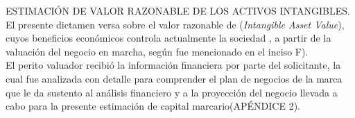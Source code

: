 \textcolor{secundario}{ESTIMACI\'ON DE VALOR RAZONABLE DE LOS ACTIVOS INTANGIBLES.} El presente dictamen versa sobre el valor razonable de \textcolor{principal}{\marca} (\textit{Intangible Asset Value}), cuyos beneficios econ\'omicos controla actualmente la sociedad \textcolor{principal}{\empresaSolicitante{}}, a partir de la valuaci\'on del negocio en marcha, seg\'un fue mencionado en el inciso F).\\[10pt]

El perito valuador recibi\'o la informaci\'on financiera por parte del solicitante, la cual fue analizada con detalle para comprender el plan de negocios de la marca que le da sustento al an\'alisis financiero y a la proyecci\'on del negocio llevada a cabo para la presente estimaci\'on de capital marcario(\textcolor{terciario}{AP\'ENDICE 2}).\\[10pt] 


